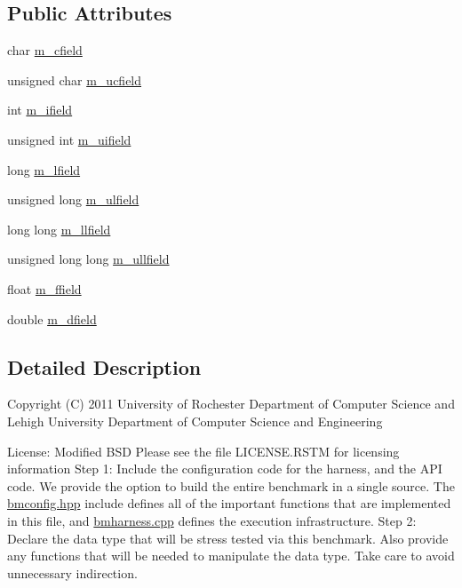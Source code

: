 \subsection*{Public Attributes}
\begin{DoxyCompactItemize}
\item 
char \hyperlink{structTypeTestObject_a0e21088ce18545f12e2f767d685fb6b8}{m\-\_\-cfield}
\item 
unsigned char \hyperlink{structTypeTestObject_a77c4c5e8cecc69a155ec16e65f5ec256}{m\-\_\-ucfield}
\item 
int \hyperlink{structTypeTestObject_ac74080db201e9548578001cf3ee3265a}{m\-\_\-ifield}
\item 
unsigned int \hyperlink{structTypeTestObject_afa1ba65c44170e3e67349b226d025a11}{m\-\_\-uifield}
\item 
long \hyperlink{structTypeTestObject_a447602463d076d585467454ab616b146}{m\-\_\-lfield}
\item 
unsigned long \hyperlink{structTypeTestObject_a219515b380b5f43f8646199805b4a2d6}{m\-\_\-ulfield}
\item 
long long \hyperlink{structTypeTestObject_a0534c9fd1e8b5ccbc69e832cbba13db9}{m\-\_\-llfield}
\item 
unsigned long long \hyperlink{structTypeTestObject_a7db847d5c534c1759b5f9fd3c9c401fa}{m\-\_\-ullfield}
\item 
float \hyperlink{structTypeTestObject_aa7c8afdbf0b4eb13afde9bac11a35e48}{m\-\_\-ffield}
\item 
double \hyperlink{structTypeTestObject_a6aafede1267ce110cd1b189eae44e43a}{m\-\_\-dfield}
\end{DoxyCompactItemize}


\subsection{Detailed Description}
Copyright (C) 2011 University of Rochester Department of Computer Science and Lehigh University Department of Computer Science and Engineering

License\-: Modified B\-S\-D Please see the file L\-I\-C\-E\-N\-S\-E.\-R\-S\-T\-M for licensing information Step 1\-: Include the configuration code for the harness, and the A\-P\-I code. We provide the option to build the entire benchmark in a single source. The \hyperlink{bmconfig_8hpp}{bmconfig.\-hpp} include defines all of the important functions that are implemented in this file, and \hyperlink{bmharness_8cpp}{bmharness.\-cpp} defines the execution infrastructure. Step 2\-: Declare the data type that will be stress tested via this benchmark. Also provide any functions that will be needed to manipulate the data type. Take care to avoid unnecessary indirection. 

